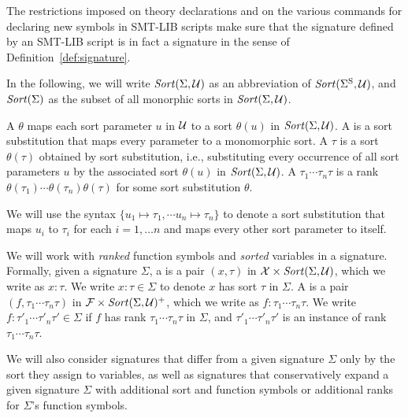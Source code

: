 \begin{remark}
The restrictions imposed on theory declarations and on the various commands
for declaring new symbols in SMT-LIB scripts make sure that 
the signature defined by an SMT-LIB script is in fact a signature 
in the sense of Definition~\ref{def:signature}.
\end{remark}

In the following, we will write $\mathit{Sort}(\Sigma, \mathcal{U})$ as an abbreviation 
of $\mathit{Sort}(\Sigma^\mathrm{S}, \mathcal{U})$, and $\mathit{Sort}(\Sigma)$ as the subset of all 
monorphic sorts in $\mathit{Sort}(\Sigma, \mathcal{U})$.
\begin{definition}
A  $\theta$
maps each sort parameter $u$ in $\mathcal{U}$ to a sort $\theta(u)$ in $\mathit{Sort}(\Sigma,\mathcal{U})$.
A  is a sort substitution that maps every parameter
to a monomorphic sort.
A  $\tau$ is a sort $\theta(\tau)$ obtained
by sort substitution, i.e.,
substituting every occurrence of all sort parameters $u$ by the associated sort
$\theta(u)$ in $\mathit{Sort}(\Sigma,\mathcal{U})$.
A  $\tau_1\cdots\tau_n \tau$ is a rank
$\theta(\tau_1)\cdots\theta(\tau_n)\theta(\tau)$ for some sort substitution
$\theta$.
\end{definition}
We will use the syntax $\{u_1 \mapsto \tau_1, \cdots u_n \mapsto \tau_n \}$
to denote a sort substitution that maps $u_i$ to $\tau_i$ for each $i=1,\dots n$
and maps every other sort parameter to itself.

We will work with \emph{ranked} function symbols and \emph{sorted} variables
in a signature.
Formally,
given a signature $\Sigma$,
a  is 
a pair $(x,\tau)$ in $\mathcal{X} \times \mathit{Sort}(\Sigma, \mathcal{U})$,
which we write as $x{:}\tau$.
We write $x{:}\tau \in \Sigma$
to denote $x$ has sort $\tau$ in $\Sigma$.
A  is 
a pair $(f, \tau_1\cdots\tau_n\tau)$ in $\mathcal{F} \times \mathit{Sort}(\Sigma, \mathcal{U})^+$,
which we write as $f{:}\tau_1\cdots\tau_n\tau$.
We write  $f{:}\tau'_1\cdots\tau'_n\tau' \in \Sigma$
if $f$ has rank $\tau_1\cdots\tau_n\tau$ in $\Sigma$, and
$\tau'_1\cdots\tau'_n\tau'$ is an instance of rank $\tau_1\cdots\tau_n\tau$.

We will also consider signatures that differ from a given signature $\Sigma$
only by the sort they assign to variables,
as well as signatures that conservatively expand a given signature $\Sigma$
with additional sort and function symbols or additional ranks 
for $\Sigma$'s function symbols.

